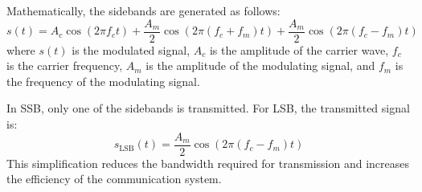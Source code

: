 Mathematically, the sidebands are generated as follows:
\[
s(t) = A_c \cos(2\pi f_c t) + \frac{A_m}{2} \cos(2\pi (f_c + f_m) t) + \frac{A_m}{2} \cos(2\pi (f_c - f_m) t)
\]
where \( s(t) \) is the modulated signal, \( A_c \) is the amplitude of the carrier wave, \( f_c \) is the carrier frequency, \( A_m \) is the amplitude of the modulating signal, and \( f_m \) is the frequency of the modulating signal.

In SSB, only one of the sidebands is transmitted. For LSB, the transmitted signal is:
\[
s_{\text{LSB}}(t) = \frac{A_m}{2} \cos(2\pi (f_c - f_m) t)
\]
This simplification reduces the bandwidth required for transmission and increases the efficiency of the communication system.

